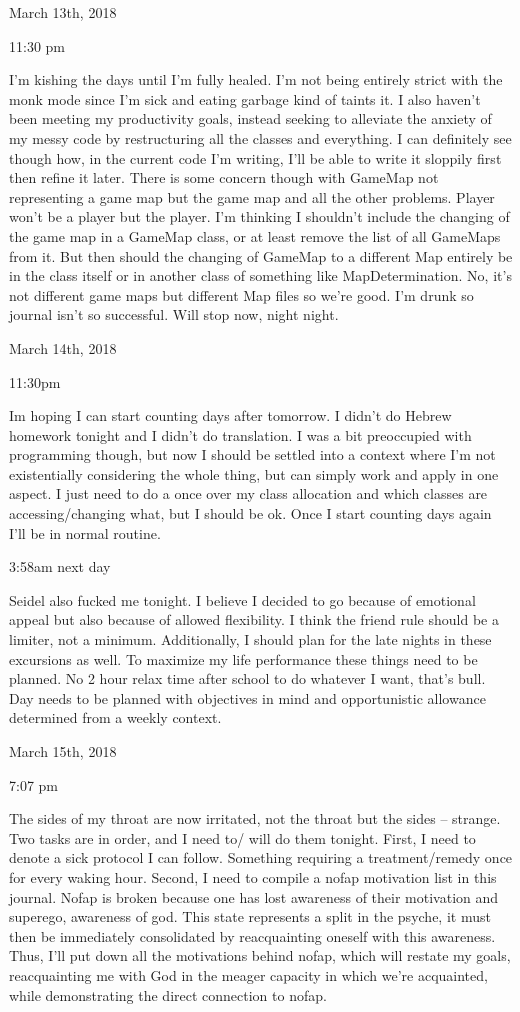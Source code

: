 \bigskip
\bigskip
March 13th, 2018

11:30 pm

I'm kishing the days until I'm fully healed. I'm not being entirely
strict with the monk mode since I'm sick and eating garbage kind of
taints it. I also haven't been meeting my productivity goals, instead
seeking to alleviate the anxiety of my messy code by restructuring all
the classes and everything. I can definitely see though how, in the
current code I'm writing, I'll be able to write it sloppily first then
refine it later. There is some concern though with GameMap not
representing a game map but the game map and all the other problems.
Player won't be a player but the player. I'm thinking I shouldn't
include the changing of the game map in a GameMap class, or at least
remove the list of all GameMaps from it. But then should the changing of
GameMap to a different Map entirely be in the class itself or in another
class of something like MapDetermination. No, it's not different game
maps but different Map files so we're good. I'm drunk so journal isn't
so successful. Will stop now, night night.

\bigskip
\bigskip
March 14th, 2018

11:30pm

Im hoping I can start counting days after tomorrow. I didn't do Hebrew
homework tonight and I didn't do translation. I was a bit preoccupied
with programming though, but now I should be settled into a context
where I'm not existentially considering the whole thing, but can simply
work and apply in one aspect. I just need to do a once over my class
allocation and which classes are accessing/changing what, but I should
be ok. Once I start counting days again I'll be in normal routine.

3:58am next day

Seidel also fucked me tonight. I believe I decided to go because of
emotional appeal but also because of allowed flexibility. I think the
friend rule should be a limiter, not a minimum. Additionally, I should
plan for the late nights in these excursions as well. To maximize my
life performance these things need to be planned. No 2 hour relax time
after school to do whatever I want, that's bull. Day needs to be planned
with objectives in mind and opportunistic allowance determined from a
weekly context.

\bigskip
\bigskip
March 15th, 2018

7:07 pm

The sides of my throat are now irritated, not the throat but the sides
-- strange. Two tasks are in order, and I need to/ will do them tonight.
First, I need to denote a sick protocol I can follow. Something
requiring a treatment/remedy once for every waking hour. Second, I need
to compile a nofap motivation list in this journal. Nofap is broken
because one has lost awareness of their motivation and superego,
awareness of god. This state represents a split in the psyche, it must
then be immediately consolidated by reacquainting oneself with this
awareness. Thus, I'll put down all the motivations behind nofap, which
will restate my goals, reacquainting me with God in the meager capacity
in which we're acquainted, while demonstrating the direct connection to
nofap.


